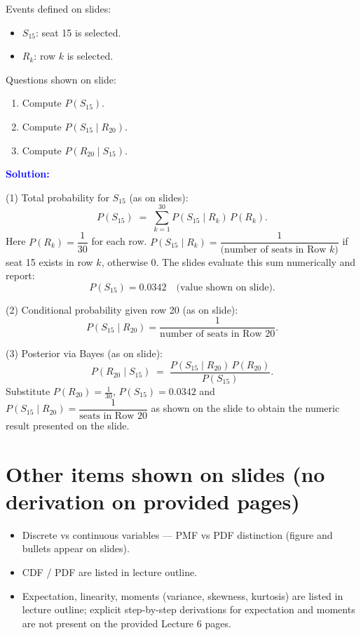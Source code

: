 \documentclass[11pt]{article}
\newcommand{\solution}{
    \vspace{0.5cm}
    \noindent\textbf{\textcolor{blue}{Solution:}}
    \vspace{0.2cm}
}
\begin{document}
\noindent Events defined on slides:
\begin{itemize}
    \item \(S_{15}\): seat 15 is selected.
    \item \(R_k\): row \(k\) is selected.
\end{itemize}

\noindent Questions shown on slide:
\begin{enumerate}
    \item Compute \(P(S_{15})\).
    \item Compute \(P(S_{15}\mid R_{20})\).
    \item Compute \(P(R_{20}\mid S_{15})\).
\end{enumerate}

\solution

\noindent (1) Total probability for \(S_{15}\) (as on slides):
\[
    P(S_{15}) \;=\; \sum_{k=1}^{30} P(S_{15}\mid R_k)\,P(R_k).
\]
Here \(P(R_k)=\dfrac{1}{30}\) for each row. \(P(S_{15}\mid R_k)=\dfrac{1}{\text{(number of seats in Row }k\text{)}}\) if seat 15 exists in row \(k\), otherwise 0. The slides evaluate this sum numerically and report:
\[
    P(S_{15}) = 0.0342 \quad\text{(value shown on slide).}
\]

\noindent (2) Conditional probability given row 20 (as on slide):
\[
    P(S_{15}\mid R_{20}) = \frac{1}{\text{number of seats in Row 20}}.
\]

\noindent (3) Posterior via Bayes (as on slide):
\[
    P(R_{20}\mid S_{15})
      \;=\; \frac{P(S_{15}\mid R_{20})\,P(R_{20})}{P(S_{15})}.
\]
Substitute \(P(R_{20})=\tfrac{1}{30}\), \(P(S_{15})=0.0342\) and \(P(S_{15}\mid R_{20})=\dfrac{1}{\text{seats in Row 20}}\) as shown on the slide to obtain the numeric result presented on the slide.

\section{Other items shown on slides (no derivation on provided pages)}
\begin{itemize}[left=0pt]
    \item Discrete vs continuous variables — PMF vs PDF distinction (figure and bullets appear on slides).
    \item CDF / PDF are listed in lecture outline.
    \item Expectation, linearity, moments (variance, skewness, kurtosis) are listed in lecture outline; explicit step-by-step derivations for expectation and moments are not present on the provided Lecture 6 pages.
\end{itemize}
\end{document}
